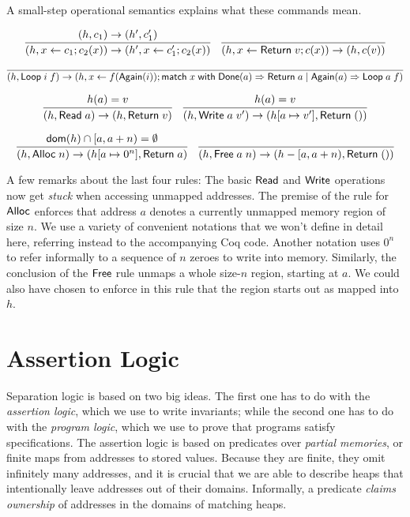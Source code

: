\documentclass{amsbook}
\theoremstyle{definition}
\theoremstyle{remark}
\numberwithin{section}{chapter}
\numberwithin{equation}{chapter}
\begin{document}
A small-step operational semantics explains what these commands mean.

$$\infer{\smallstep{(h, x \leftarrow c_1; c_2(x))}{(h', x \leftarrow c'_1; c_2(x))}}{
  \smallstep{(h, c_1)}{(h', c'_1)}
}
\quad \infer{\smallstep{(h, x \leftarrow \mt{Return} \; v; c(x))}{(h, c(v))}}{}$$

$$\infer{\smallstep{(h, \mt{Loop} \; i \; f)}{(h, x \leftarrow f(\mt{Again}(i)); \mt{match} \; x \; \mt{with} \; \mt{Done}(a) \Rightarrow \mt{Return} \; a \mid \mt{Again}(a) \Rightarrow \mt{Loop} \; a \; f)}}{}$$

$$\infer{\smallstep{(h, \mt{Read} \; a)}{(h, \mt{Return} \; v)}}{
  \msel{h}{a} = v
}
\quad \infer{\smallstep{(h, \mt{Write} \; a \; v')}{(\mupd{h}{a}{v'}, \mt{Return} \; ())}}{
  \msel{h}{a} = v
}$$

$$\infer{\smallstep{(h, \mt{Alloc} \; n)}{(\mupd{h}{a}{0^n}, \mt{Return} \; a)}}{
  \dom{h} \cap [a, a+n) = \emptyset
}
\quad \infer{\smallstep{(h, \mt{Free} \; a \; n)}{(h - [a, a+n), \mt{Return} \; ())}}{
}$$

A few remarks about the last four rules:
The basic $\mathsf{Read}$ and $\mathsf{Write}$ operations now get \emph{stuck} when accessing unmapped addresses.
The premise of the rule for $\mathsf{Alloc}$ enforces that address $a$ denotes a currently unmapped memory region of size $n$.
We use a variety of convenient notations that we won't define in detail here, referring instead to the accompanying Coq code.
Another notation uses $0^n$ to refer informally to a sequence of $n$ zeroes to write into memory.
Similarly, the conclusion of the $\mathsf{Free}$ rule unmaps a whole size-$n$ region, starting at $a$.
We could also have chosen to enforce in this rule that the region starts out as mapped into $h$.

\section{Assertion Logic}

Separation logic is based on two big ideas.
The first one has to do with the \emph{assertion logic}, which we use to write invariants; while the second one has to do with the \emph{program logic}, which we use to prove that programs satisfy specifications.
The assertion logic is based on predicates over \emph{partial memories}, or finite maps from addresses to stored values.
Because they are finite, they omit infinitely many addresses, and it is crucial that we are able to describe heaps that intentionally leave addresses out of their domains.
Informally, a predicate \emph{claims ownership} of addresses in the domains of matching heaps.
\end{document}
